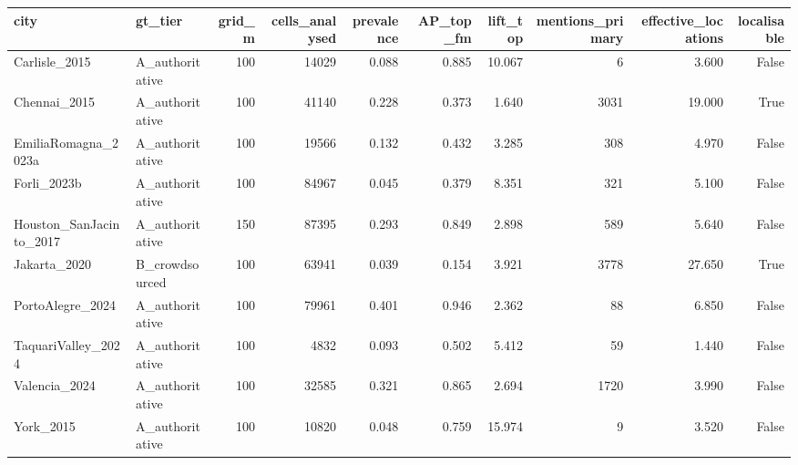 \begin{tabular}{llrrrrrrrr}
\toprule
city & gt_tier & grid_m & cells_analysed & prevalence & AP_top_fm & lift_top & mentions_primary & effective_locations & localisable \\
\midrule
Carlisle\_2015 & A\_authoritative & 100 & 14029 & 0.088 & 0.885 & 10.067 & 6 & 3.600 & False \\
Chennai\_2015 & A\_authoritative & 100 & 41140 & 0.228 & 0.373 & 1.640 & 3031 & 19.000 & True \\
EmiliaRomagna\_2023a & A\_authoritative & 100 & 19566 & 0.132 & 0.432 & 3.285 & 308 & 4.970 & False \\
Forli\_2023b & A\_authoritative & 100 & 84967 & 0.045 & 0.379 & 8.351 & 321 & 5.100 & False \\
Houston\_SanJacinto\_2017 & A\_authoritative & 150 & 87395 & 0.293 & 0.849 & 2.898 & 589 & 5.640 & False \\
Jakarta\_2020 & B\_crowdsourced & 100 & 63941 & 0.039 & 0.154 & 3.921 & 3778 & 27.650 & True \\
PortoAlegre\_2024 & A\_authoritative & 100 & 79961 & 0.401 & 0.946 & 2.362 & 88 & 6.850 & False \\
TaquariValley\_2024 & A\_authoritative & 100 & 4832 & 0.093 & 0.502 & 5.412 & 59 & 1.440 & False \\
Valencia\_2024 & A\_authoritative & 100 & 32585 & 0.321 & 0.865 & 2.694 & 1720 & 3.990 & False \\
York\_2015 & A\_authoritative & 100 & 10820 & 0.048 & 0.759 & 15.974 & 9 & 3.520 & False \\
\bottomrule
\end{tabular}
